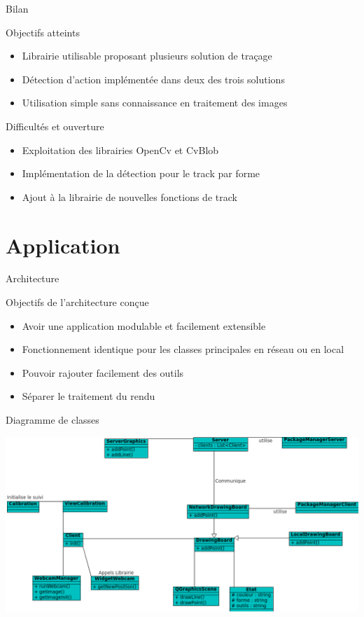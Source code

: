 \documentclass{beamer}
\begin{document}
		\begin{frame}{Bilan}
			\begin{exampleblock}{Objectifs atteints}
				\begin{itemize}
				\item Librairie utilisable proposant plusieurs solution de traçage
				\item Détection d'action implémentée dans deux des trois solutions
				\item Utilisation simple sans connaissance en traitement des images
				\end{itemize}
			\end{exampleblock}
			\pause
			\begin{alertblock}{Difficultés et ouverture}
				\begin{itemize}
				\item Exploitation des librairies OpenCv et CvBlob 
				\item Implémentation de la détection pour le track par forme
				\item Ajout à la librairie de nouvelles fonctions de track
				\end{itemize}
			\end{alertblock}
		\end{frame}
	
	\section{Application}
		\begin{frame}{Architecture}
			\begin{block}{Objectifs de l'architecture conçue}
				\begin{itemize}
				\item{Avoir une application modulable et facilement extensible}
				\item{Fonctionnement identique pour les classes principales en réseau ou en local}
				\item{Pouvoir rajouter facilement des outils}
				\item{Séparer le traitement du rendu}
				\end{itemize}
			\end{block}
		\end{frame}
		
		\begin{frame}{Diagramme de classes}
			\begin{center}		
			\includegraphics[scale=0.45]{../uml/classes.png}
			\end{center}
		\end{frame}
\end{document}
